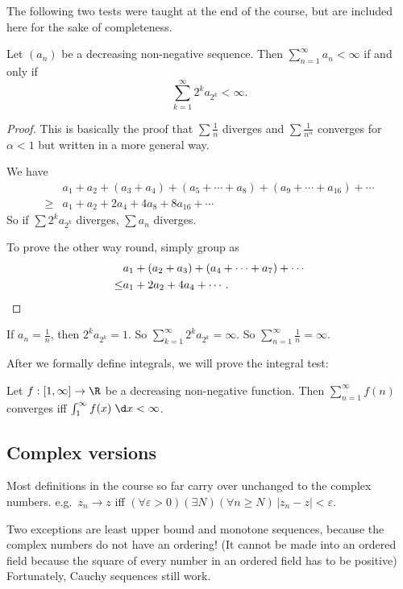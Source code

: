 \documentclass[a4paper]{article}
\begin{document}
The following two tests were taught at the end of the course, but are included here for the sake of completeness.
\begin{thm}
  Let $(a_n)$ be a decreasing non-negative sequence. Then $\sum_{n = 1}^\infty a_n < \infty$ if and only if
  \[
    \sum_{k = 1}^\infty 2^k a_{2^k} < \infty.
  \]
\end{thm}

\begin{proof}
  This is basically the proof that $\sum \frac{1}{n}$ diverges and $\sum \frac{1}{n^{\alpha}}$ converges for $\alpha < 1$ but written in a more general way.

  We have
  \begin{align*}
    &a_1 + a_2 + (a_3 + a_4) + (a_5 + \cdots + a_8) + (a_9 + \cdots + a_{16}) + \cdots\\
    \geq & a_1 + a_2 + 2a_4 + 4a_8 + 8 a_{16} + \cdots
  \end{align*}
  So if $\sum 2^k a_{2^k}$ diverges, $\sum a_n$ diverges.

  To prove the other way round, simply group as
  \begin{align*}
    & a_1 + (a_2 + a_3) + (a_4 + \cdots + a_7) + \cdots\\
    \leq & a_1 + 2a_2 + 4a_4 + \cdots .\qedhere
  \end{align*}
\end{proof}

\begin{eg}
  If $a_n = \frac{1}{n}$, then $2^k a_{2^k} = 1$. So $\sum_{k = 1}^\infty 2^k a_{2^k} = \infty$. So $\sum_{n = 1}^\infty \frac{1}{n} = \infty$.
\end{eg}

After we formally define integrals, we will prove the integral test:
\begin{thm}
  Let $f: [1, \infty] \to \R$ be a decreasing non-negative function. Then $\sum_{n = 1}^\infty f(n)$ converges iff $\int_1^\infty f(x)\;\d x < \infty$.
\end{thm}

\subsection{Complex versions}
Most definitions in the course so far carry over unchanged to the complex numbers. e.g.\ $z_n \to z$ iff $(\forall \varepsilon > 0)(\exists N)(\forall n\geq N)\, |z_n - z| < \varepsilon$.

Two exceptions are least upper bound and monotone sequences, because the complex numbers do not have an ordering! (It cannot be made into an ordered field because the square of every number in an ordered field has to be positive) Fortunately, Cauchy sequences still work.
\end{document}
